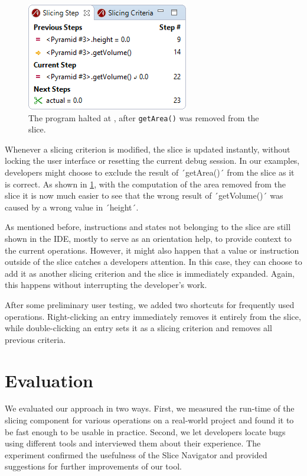 \begin{figure}
	\centering
		\includegraphics[width=0.40\linewidth]{img/slice2.png}
	\caption{The program halted at , after \lstinline{getArea()} was removed from the slice.}
	\label{fig:slice2}
\end{figure}

Whenever a slicing criterion is modified, the slice is updated instantly, without locking the user interface or resetting the current debug session.
In our examples, developers might choose to exclude the result of ´getArea()´ from the slice as it is correct.
As shown in \cref{fig:slice2}, with the computation of the area removed from the slice it is now much easier to see that the wrong result of ´getVolume()´ was caused by a wrong value in ´height´.

As mentioned before, instructions and states not belonging to the slice are still shown in the IDE, mostly to serve as an orientation help, to provide context to the current operations.
However, it might also happen that a value or instruction outside of the slice catches a developers attention.
In this case, they can choose to add it as another slicing criterion and the slice is immediately expanded.
Again, this happens without interrupting the developer's work.

After some preliminary user testing, we added two shortcuts for frequently used operations.
Right-clicking an entry immediately removes it entirely from the slice, while double-clicking an entry sets it as a slicing criterion and removes all previous criteria.
\tmpEnd

\section{Evaluation}
\label{sec:eval}

\tmpStart
We evaluated our approach in two ways.
First, we measured the run-time of the slicing component for various operations on a real-world project and found it to be fast enough to be usable in practice.
Second, we let developers locate bugs using different tools and interviewed them about their experience.
The experiment confirmed the usefulness of the Slice Navigator and provided suggestions for further improvements of our tool.

